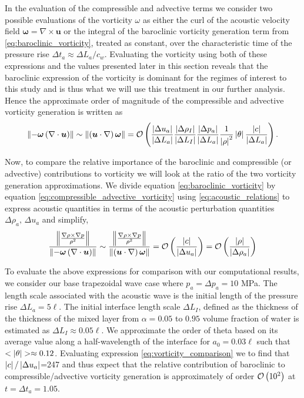 In the evaluation of the compressible and advective terms we consider
two possible evaluations of the vorticity $\omega$ as either the curl
of the acoustic velocity field
$\boldsymbol{\omega}=\nabla\times\boldsymbol{u}$ or the integral of
the baroclinic vorticity generation term from
\eqref{eq:baroclinic_vorticity}, treated as constant, over the
characteristic time of the pressure rise
$\Delta t_a\approx\Delta L_a/c_w$. Evaluating the vorticity using both
of these expressions and the values presented later in this section
reveals that the baroclinic expression of the vorticity is dominant
for the regimes of interest to this study and is thus what we will use
this treatment in our further analysis. Hence the approximate order of magnitude of the compressible and
advective vorticity generation is written as
\begin{align}
  \label{eq:compressible_advective_vorticity}%
  \norm{-\boldsymbol{\omega}\left(\nabla\cdot\boldsymbol{u}\right)}\sim \norm{\left(\boldsymbol{u}\cdot\nabla\right)\boldsymbol{\omega}} = %
  \orderof{%
  \frac{\abs{\Delta u_a}}{\abs{\Delta L_a}} \frac{\abs{\Delta \rho_I}}{\abs{\Delta L_I}}%
  \frac{\abs{\Delta p_a}}{\abs{\Delta L_a}} \frac{1}{\abs{\rho}^2}\abs{\theta}\frac{\abs{c}}{\abs{\Delta L_a}}%
  }.%
\end{align}

Now, to compare the relative importance of the baroclinic and
compressible (or advective) contributions to vorticity we will look at
the ratio of the two vorticity generation approximations. We divide
equation \eqref{eq:baroclinic_vorticity} by equation
\eqref{eq:compressible_advective_vorticity} using
\eqref{eq:acoustic_relations} to express acoustic quantities in terms
of the acoustic perturbation quantities $\Delta \rho_a,\,\Delta u_a$ and simplify,
\begin{align} \label{eq:vorticity_comparison}
  \frac{\norm{\frac{\nabla\rho\times\nabla
  p}{\rho^2}}}{\norm{-\boldsymbol{\omega}\left(\nabla\cdot\boldsymbol{u}\right)}}
  \sim
  \frac{\norm{\frac{\nabla\rho\times\nabla
  p}{\rho^2}}}{\norm{\left(\boldsymbol{u}\cdot\nabla\right)\boldsymbol{\omega}}}
  = \orderof{\frac{\abs{c}}{\abs{\Delta u_a}}} = \orderof{\frac{\abs{\rho}}{\abs{\Delta \rho_a}}}%
\end{align}

To evaluate the above expressions for comparison with our
computational results, we consider our base trapezoidal wave case
where $p_a = \Delta p_a = 10$ MPa. The length scale associated with
the acoustic wave is the initial length of the pressure rise
$\Delta L_a=5\ell$. The initial interface length scale
$\Delta L_I$, defined as the thickness of the thickness of the mixed
layer from $\alpha=0.05$ to $0.95$ volume fraction of water is estimated
as $\Delta L_I \approx 0.05\ell$. We approximate the order of theta
based on its average value along a half-wavelength of the interface
for $a_0=0.03\ell$ such that
$<\abs{\theta}>\approx0.12$. Evaluating expression
\eqref{eq:vorticity_comparison} we to find that
$\left|c\right|/\left|\Delta u_a\right|$=247 and thus expect that the relative
contribution of baroclinic to compressible/advective vorticity
generation is approximately of order $\mathcal{O}\left(10^2\right)$ at
$t=\Delta t_a=1.05$.

